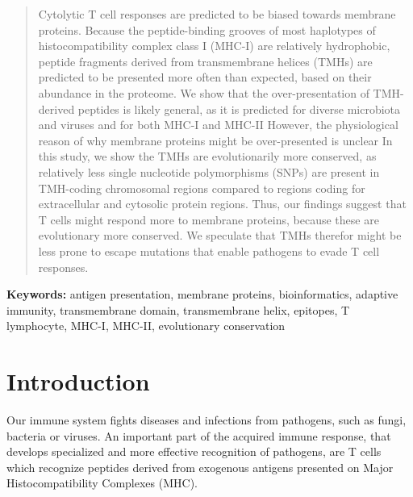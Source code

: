 \begin{abstract}

Cytolytic T cell responses are predicted to be biased towards membrane proteins. 
Because the peptide-binding grooves of most haplotypes 
of histocompatibility complex class I (MHC-I) are relatively hydrophobic, 
peptide fragments derived from transmembrane helices (TMHs) 
are predicted to be presented more often than expected,
based on their abundance in the proteome.
We show that the over-presentation of TMH-derived peptides is likely general, 
as it is predicted for diverse microbiota and viruses 
and for both MHC-I and MHC-II
However, the physiological reason of why membrane proteins might be 
over-presented is unclear
In this study, we show the TMHs are evolutionarily more conserved, 
as relatively less single nucleotide polymorphisms (SNPs) 
are present in TMH-coding chromosomal regions 
compared to regions coding for extracellular and cytosolic protein regions. 
Thus, our findings suggest that T cells might respond 
more to membrane proteins, because these are evolutionary more conserved.
We speculate that TMHs therefor might be less prone to escape mutations 
that enable pathogens to evade T cell responses.

\end{abstract}

{\bf Keywords:} antigen presentation, membrane proteins, bioinformatics, 
adaptive immunity, transmembrane domain, transmembrane helix, 
epitopes, T lymphocyte, MHC-I, MHC-II, evolutionary conservation

\section{Introduction}


Our immune system fights diseases and infections from pathogens, 
such as fungi, bacteria or viruses. 
An important part of the acquired immune response, 
that develops specialized and more effective recognition of pathogens, 
are T cells which recognize peptides derived from 
exogenous antigens presented on Major Histocompatibility Complexes (MHC). 

